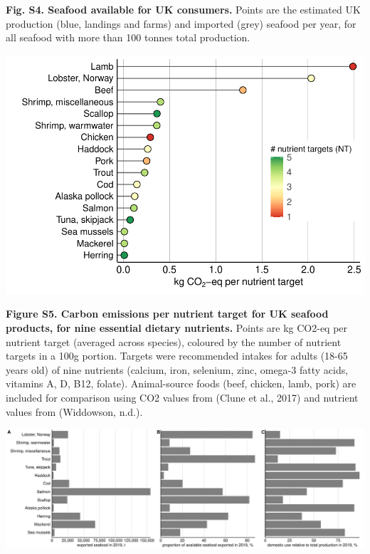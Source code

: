 \documentclass[
]{article}
\begin{document}
\textbf{Fig. S4. Seafood available for UK consumers.} Points are the
estimated UK production (blue, landings and farms) and imported (grey)
seafood per year, for all seafood with more than 100 tonnes total
production.

\newpage

\begin{center}\includegraphics[height=0.8\textheight]{fig/final/Figure3} \end{center}

\textbf{Figure S5. Carbon emissions per nutrient target for UK seafood
products, for nine essential dietary nutrients.} Points are kg CO2-eq
per nutrient target (averaged across species), coloured by the number of
nutrient targets in a 100g portion. Targets were recommended intakes for
adults (18-65 years old) of nine nutrients (calcium, iron, selenium,
zinc, omega-3 fatty acids, vitamins A, D, B12, folate). Animal-source
foods (beef, chicken, lamb, pork) are included for comparison using CO2
values from (Clune et al., 2017) and nutrient values from (Widdowson,
n.d.).

\newpage

\begin{center}\includegraphics[height=0.8\textheight]{fig/final/FigureSX_UK_export} \end{center}
\end{document}
